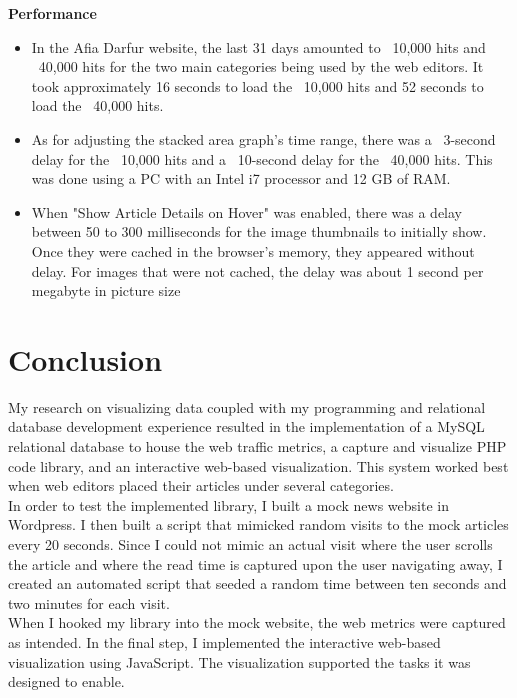 \documentclass[12pt]{article}
\begin{document}
{\vspace{0.2in}

\noindent\textbf{Performance}
\begin{itemize}
\item In the Afia Darfur website, the last 31 days amounted to ~10,000 hits and ~40,000 hits for the two main categories being used by the web editors. It took approximately 16 seconds to load the ~10,000 hits and 52 seconds to load the ~40,000 hits. 
\item As for adjusting the stacked area graph's time range, there was a ~3-second delay for the ~10,000 hits and a ~10-second delay for the ~40,000 hits. This was done using a PC with an Intel i7 processor and 12 GB of RAM. 
\item When "Show Article Details on Hover" was enabled, there was a delay between 50 to 300 milliseconds for the image thumbnails to initially show. Once they were cached in the browser's memory, they appeared without delay. For images that were not cached, the delay was about 1 second per megabyte in picture size
\end{itemize}

\newpage

\section{Conclusion}
My research on visualizing data coupled with my programming and relational database development experience resulted in the implementation of a  MySQL relational database to house the web traffic metrics, a capture and visualize PHP code library, and an interactive web-based visualization. This system worked best when web editors placed their articles under several categories.  \\ 

In order to test the implemented library, I built a mock news website in Wordpress. I then built a script that mimicked random visits to the mock articles every 20 seconds. Since I could not mimic an actual visit where the user scrolls the article and where the read time is captured upon the user navigating away, I created an automated script that seeded a random time between ten seconds and two minutes for each visit. \\ When I hooked my library into the mock website, the web metrics were captured as intended. 
In the final step, I implemented the interactive web-based visualization using JavaScript. The visualization supported the tasks it was designed to enable. \\

}
\end{document}
